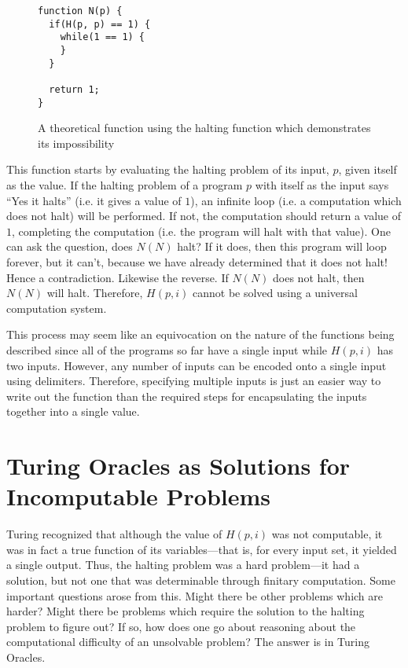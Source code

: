 \begin{figure}[H]
\begin{mdframed}
\begin{verbatim}
function N(p) {
  if(H(p, p) == 1) {
    while(1 == 1) {
    }
  }

  return 1;
}
\end{verbatim}
\end{mdframed}
\caption{A theoretical function using the halting function which demonstrates its impossibility}
\end{figure}

This function starts by evaluating the halting problem of its input, $p$, given itself as the value.  If the halting problem of a program $p$ with itself as the input says ``Yes it halts'' (i.e. it gives a value of $1$), an infinite loop (i.e. a computation which does not halt) will be performed.  If not, the computation should return a value of $1$, completing the computation (i.e. the program will halt with that value).  One can ask the question, does $N(N)$ halt?  If it does, then this program will loop forever, but it can't, because we have already determined that it does not halt!  Hence a contradiction.  Likewise the reverse.  If $N(N)$ does not halt, then $N(N)$ will halt. Therefore, $H(p, i)$ cannot be solved using a universal computation system.

This process may seem like an equivocation on the nature of the functions being described
since all of the programs so far have a single input while $H(p, i)$ has two inputs.  However, any number of inputs can be encoded onto a single input using delimiters.  Therefore, specifying multiple inputs is just an easier way to write out the function than the required steps for encapsulating the inputs together into a single value.

\section[Turing Oracles as Solutions]{Turing Oracles as Solutions for Incomputable Problems}

Turing recognized that although the value of $H(p, i)$ was not computable, it was in fact a true function of its variables---that is, for every input set, it yielded a single output.  Thus, the halting problem was a hard problem---it had a solution, but not one that was determinable through finitary computation.  Some important questions arose from this.  Might there be other problems which are harder?  Might there be problems which require the solution to the halting problem to figure out?  If so, how does one go about reasoning about the computational difficulty of an unsolvable problem?  The answer is in Turing Oracles.

